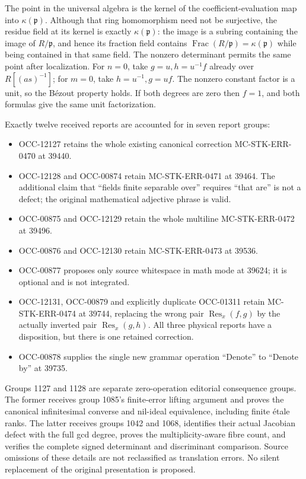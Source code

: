 The point in the universal algebra is the kernel of the coefficient-evaluation map into \(\kappa(\mathfrak p)\). Although that ring homomorphism need not be surjective, the residue field at its kernel is exactly \(\kappa(\mathfrak p)\): the image is a subring containing the image of \(R/\mathfrak p\), and hence its fraction field contains \(\operatorname{Frac}(R/\mathfrak p)=\kappa(\mathfrak p)\) while being contained in that same field. The nonzero determinant permits the same point after localization. For \(n=0\), take \(g=u,h=u^{-1}f\) already over \(R[(as)^{-1}]\); for \(m=0\), take \(h=u^{-1},g=uf\). The nonzero constant factor is a unit, so the Bézout property holds. If both degrees are zero then \(f=1\), and both formulas give the same unit factorization.

Exactly twelve received reports are accounted for in seven report groups:

\begin{itemize}
\tightlist
\item
  OCC-12127 retains the whole existing canonical correction MC-STK-ERR-0470 at 39440.
\item
  OCC-12128 and OCC-00874 retain MC-STK-ERR-0471 at 39464. The additional claim that ``fields finite separable over'' requires ``that are'' is not a defect; the original mathematical adjective phrase is valid.
\item
  OCC-00875 and OCC-12129 retain the whole multiline MC-STK-ERR-0472 at 39496.
\item
  OCC-00876 and OCC-12130 retain MC-STK-ERR-0473 at 39536.
\item
  OCC-00877 proposes only source whitespace in math mode at 39624; it is optional and is not integrated.
\item
  OCC-12131, OCC-00879 and explicitly duplicate OCC-01311 retain MC-STK-ERR-0474 at 39744, replacing the wrong pair \(\operatorname{Res}_x(f,g)\) by the actually inverted pair \(\operatorname{Res}_x(g,h)\). All three physical reports have a disposition, but there is one retained correction.
\item
  OCC-00878 supplies the single new grammar operation ``Denote'' to ``Denote by'' at 39735.
\end{itemize}

Groups 1127 and 1128 are separate zero-operation editorial consequence groups. The former receives group 1085's finite-error lifting argument and proves the canonical infinitesimal converse and nil-ideal equivalence, including finite étale ranks. The latter receives groups 1042 and 1068, identifies their actual Jacobian defect with the full gcd degree, proves the multiplicity-aware fibre count, and verifies the complete signed determinant and discriminant comparison. Source omissions of these details are not reclassified as translation errors. No silent replacement of the original presentation is proposed.

